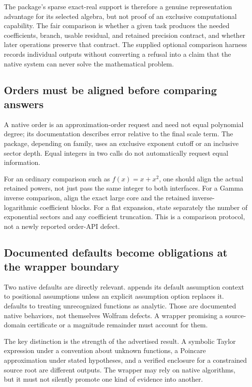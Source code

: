 \documentclass[11pt,letterpaper]{article}
\newcommand{\code}[1]{\texttt{\detokenize{#1}}}
\begin{document}
The package's sparse exact-real support is therefore a genuine representation advantage for its selected algebra, but not proof of an exclusive computational capability. The fair comparison is whether a given task produces the needed coefficients, branch, usable residual, and retained precision contract, and whether later operations preserve that contract. The supplied optional comparison harness records individual outputs without converting a refusal into a claim that the native system can never solve the mathematical problem.

\subsection{Orders must be aligned before comparing answers}
A native \code{AsymptoticSolve} order is an approximation-order request and need not equal polynomial degree; its documentation describes error relative to the final scale term. The package, depending on family, uses an exclusive exponent cutoff or an inclusive sector depth. Equal integers in two calls do not automatically request equal information.\cite{wlasolve,flat,fourier,gammainverse}

For an ordinary comparison such as $f(x)=x+x^2$, one should align the actual retained powers, not just pass the same integer to both interfaces. For a Gamma inverse comparison, align the exact large core and the retained inverse-logarithmic coefficient blocks. For a flat expansion, state separately the number of exponential sectors and any coefficient truncation. This is a comparison protocol, not a newly reported order-API defect.

\subsection{Documented defaults become obligations at the wrapper boundary}
Two native defaults are directly relevant. \code{Refine} appends its default assumption context to positional assumptions unless an explicit assumption option replaces it. \code{Series} defaults to treating unrecognized functions as analytic. Those are documented native behaviors, not themselves Wolfram defects. A wrapper promising a source-domain certificate or a magnitude remainder must account for them.\cite{wlrefine,wlseries}

The key distinction is the strength of the advertised result. A symbolic Taylor expression under a convention about unknown functions, a Poincare approximation under stated hypotheses, and a verified enclosure for a constrained source root are different outputs. The wrapper may rely on native algorithms, but it must not silently promote one kind of evidence into another.
\end{document}
